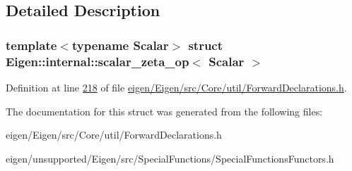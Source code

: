 \subsection{Detailed Description}
\subsubsection*{template$<$typename Scalar$>$\newline
struct Eigen\+::internal\+::scalar\+\_\+zeta\+\_\+op$<$ Scalar $>$}



Definition at line \hyperlink{eigen_2_eigen_2src_2_core_2util_2_forward_declarations_8h_source_l00218}{218} of file \hyperlink{eigen_2_eigen_2src_2_core_2util_2_forward_declarations_8h_source}{eigen/\+Eigen/src/\+Core/util/\+Forward\+Declarations.\+h}.



The documentation for this struct was generated from the following files\+:\begin{DoxyCompactItemize}
\item 
eigen/\+Eigen/src/\+Core/util/\+Forward\+Declarations.\+h\item 
eigen/unsupported/\+Eigen/src/\+Special\+Functions/\+Special\+Functions\+Functors.\+h\end{DoxyCompactItemize}
